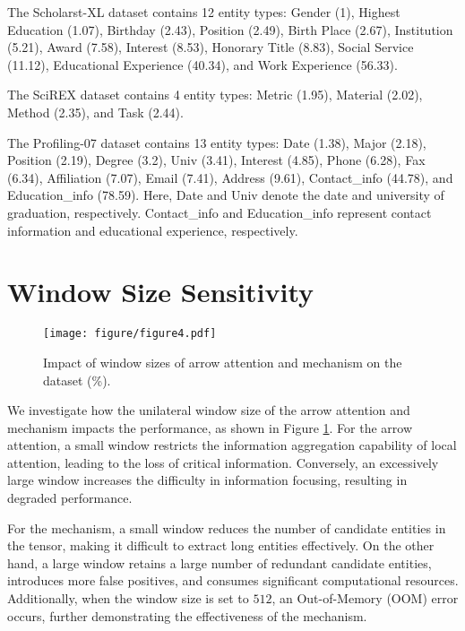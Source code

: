The Scholarst-XL dataset contains 12 entity types: Gender (1), Highest Education (1.07), Birthday (2.43), Position (2.49), Birth Place (2.67), Institution (5.21), Award (7.58), Interest (8.53), Honorary Title (8.83), Social Service (11.12), Educational Experience (40.34), and Work Experience (56.33). 

The SciREX dataset contains 4 entity types: Metric (1.95), Material (2.02), Method (2.35), and Task (2.44).

The Profiling-07 dataset contains 13 entity types: Date (1.38), Major (2.18), Position (2.19), Degree (3.2), Univ (3.41), Interest (4.85), Phone (6.28), Fax (6.34), Affiliation (7.07), Email (7.41), Address (9.61), Contact\_info (44.78), and Education\_info (78.59). Here, Date and Univ denote the date and university of graduation, respectively. Contact\_info and Education\_info represent contact information and educational experience, respectively.

\section{Window Size Sensitivity}

\begin{figure}[t]
\centering
\texttt{[image: figure/figure4.pdf]} %
\caption{
Impact of window sizes of arrow attention and \biswa mechanism on the \profiling dataset (\%).
}
\label{fig:window-size-exploration}
\end{figure}


We investigate how the unilateral window size of the arrow attention and \biswa mechanism impacts the performance, as shown in Figure \ref{fig:window-size-exploration}. 
For the arrow attention, a small window restricts the information aggregation capability of local attention, leading to the loss of critical information. 
Conversely, an excessively large window increases the difficulty in information focusing, 
resulting in degraded performance. 

For the \biswa mechanism, a small window reduces the number of candidate entities in the \tokenspan tensor, making it difficult to extract long entities effectively. 
On the other hand, a large window retains a large number of redundant candidate entities, introduces more false positives, and consumes significant computational resources. 
Additionally, when the window size is set to $512$, an Out-of-Memory (OOM) error occurs, further demonstrating the effectiveness of the \biswa mechanism.